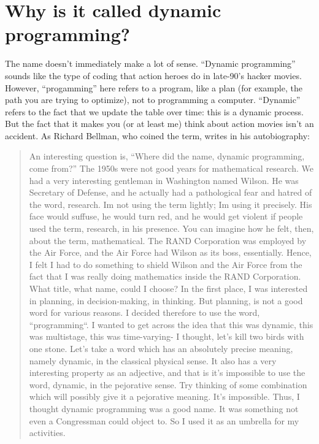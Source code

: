 \documentclass [12pt]{article}
\theoremstyle{definition}
\begin{document}
\section{Why is it called dynamic programming?}

The name doesn't immediately make a lot of sense. ``Dynamic programming'' sounds like the type of coding that action heroes do in late-90's hacker movies. However, ``progamming'' here refers to a program, like a plan (for example, the path you are trying to optimize), not to programming a computer. ``Dynamic'' refers to the fact that we update the table over time: this is a dynamic process. But the fact that it makes you (or at least me) think about action movies isn't an accident. As Richard Bellman, who coined the term, writes in his autobiography:

\begin{quote} 

An interesting question is, ``Where did the name, dynamic programming, come from?'' The 1950s were not good years for mathematical research. We had a very interesting gentleman in Washington named Wilson. He was Secretary of Defense, and he actually had a pathological fear and hatred of the word, research. Im not using the term lightly; Im using it precisely. His face would suffuse, he would turn red, and he would get violent if people used the term, research, in his presence. You can imagine how he felt, then, about the term, mathematical. The RAND Corporation was employed by the Air Force, and the Air Force had Wilson as its boss, essentially. Hence, I felt I had to do something to shield Wilson and the Air Force from the fact that I was really doing mathematics inside the RAND Corporation. What title, what name, could I choose? In the first place, I was interested in planning, in decision-making, in thinking. But planning, is not a good word for various reasons. I decided therefore to use the word, ``programming``. I wanted to get across the idea that this was dynamic, this was multistage, this was time-varying- I thought, let’s kill two birds with one stone. Let’s take a word which has an absolutely precise meaning, namely dynamic, in the classical physical sense. It also has a very interesting property as an adjective, and that is it’s impossible to use the word, dynamic, in the pejorative sense. Try thinking of some combination which will possibly give it a pejorative meaning. It’s impossible. Thus, I thought dynamic programming was a good name. It was something not even a Congressman could object to. So I used it as an umbrella for my activities.
\end{quote}
\end{document}
